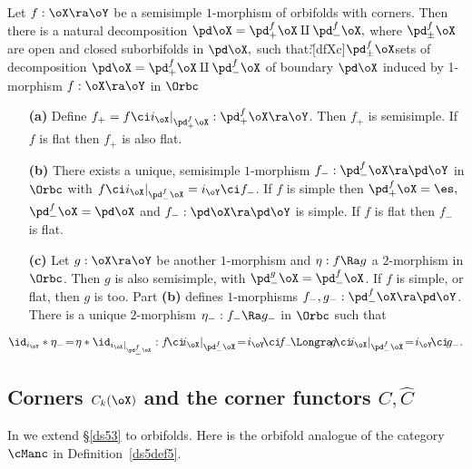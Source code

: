 \documentclass{article}
\begin{document}
\begin{thm} Let\/ $f:\oX\ra\oY$ be a semisimple $1$-morphism of
orbifolds with corners. Then there is a natural decomposition
$\pd\oX=\pd^f_+\oX\amalg\pd^f_-\oX,$ where $\pd^f_\pm\oX$ are open
and closed suborbifolds in $\pd\oX,$ such that:\G[dfXc]{$\pd^f_\pm
\oX$}{sets of decomposition $\pd\oX=\pd^f_+\oX\amalg\pd^f_-\oX$ of
boundary $\pd\oX$ induced by 1-morphism $f:\oX\ra\oY$ in $\Orbc$}
\begin{itemize}
\setlength{\itemsep}{0pt}
\setlength{\parsep}{0pt}
\item[{\bf(a)}] Define $f_+=f\ci i_\oX\vert_{\pd^f_+\oX}:
\pd_+^f\oX\ra\oY$. Then $f_+$ is semisimple. If\/ $f$ is flat
then $f_+$ is also flat.
\item[{\bf(b)}] There exists a unique, semisimple\/ $1$-morphism
$f_-:\pd_-^f\oX\ra\pd\oY$ in $\Orbc$ with\/ $f\ci
i_\oX\vert_{\pd_-^f\oX}=i_\oY\ci f_-$. If\/ $f$ is simple then\/
$\pd^f_+\oX=\es,$ $\pd^f_-\oX=\pd\oX$ and\/ $f_-:\pd\oX\ra
\pd\oY$ is simple. If\/ $f$ is flat then $f_-$ is flat.
\item[{\bf(c)}] Let\/ $g:\oX\ra\oY$ be another $1$-morphism
and\/ $\eta:f\Ra g$ a $2$-morphism in $\Orbc$. Then $g$ is also
semisimple, with\/ $\pd_-^g\oX=\pd_-^f\oX$. If\/ $f$ is simple,
or flat, then $g$ is too. Part\/ {\bf(b)} defines $1$-morphisms
$f_-,g_-:\pd_-^f\oX\ra\pd\oY$. There is a unique $2$-morphism
$\eta_-:f_-\Ra g_-$ in\/ $\Orbc$ such that
\end{itemize}\vskip -5pt
\begin{equation*}
\id_{i_\oY}*\eta_-\!=\!\eta*\id_{i_\oX\vert_{\pd_-^f\oX}}:
f\!\ci\!i_\oX\vert_{\pd_-^f\oX}\!=\!i_\oY\!\ci\!f_-\!\Longra\!
g\!\ci\!i_\oX\vert_{\pd_-^f\oX}\!=\!i_\oY\!\ci\!g_-.
\end{equation*}
\label{ds12thm1}
\end{thm}

\subsection{Corners $C_k(\oX)$ and the corner functors $C,\hat C$}
\label{ds123}

In \cite[\S 8.7]{Joyc6} we extend \S\ref{ds53} to orbifolds. Here is
the orbifold analogue of the category $\cManc$ in
Definition~\ref{ds5def5}.
\end{document}
